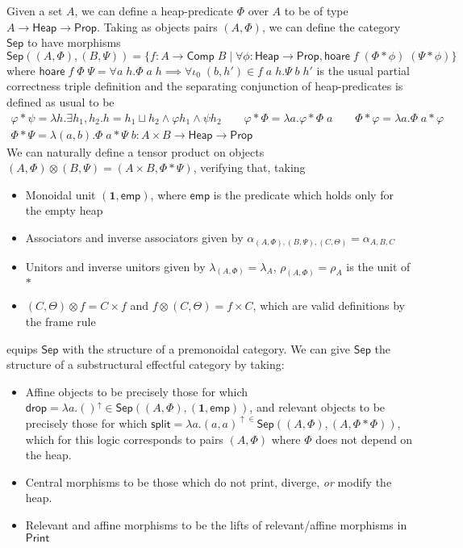 \documentclass[acmsmall,screen,review]{acmart}
\newcommand{\mb}[1]{\ensuremath{\mathbf{#1}}}
\newcommand{\ms}[1]{\ensuremath{\mathsf{#1}}}
\newcommand{\upg}[2]{{#1}^{\uparrow #2}}
\begin{document}
Given a set \(A\), we can define a heap-predicate \(\Phi\) over \(A\) to be of
type \(A \to \ms{Heap} \to \ms{Prop}\). Taking as objects pairs \((A, \Phi)\),
we can define the category \(\ms{Sep}\) to have morphisms
\begin{equation}
  \ms{Sep}((A, \Phi), (B, \Psi)) = \{f: A \to \ms{Comp}\;B 
    \mid \forall \phi: \ms{Heap} \to \ms{Prop}, \ms{hoare}\;f\;(\Phi \ast \phi)\;(\Psi \ast \phi)\}
\end{equation}
where
\(
  \ms{hoare}\;f\;\Phi\;\Psi = \forall a\;h. \Phi\;a\;h \implies \forall \iota_0\;(b, h') \in f\;a\;h. \Psi\;b\;h'
\)
is the usual partial correctness triple definition and the separating
conjunction of heap-predicates is defined as usual to be 
\begin{equation}
  \begin{gathered}
  \varphi \ast \psi = \lambda h. \exists h_1, h_2. h = h_1 \sqcup h_2 \land \varphi h_1 \land \psi h_2 
  \qquad
  \varphi \ast \Phi = \lambda a. \varphi \ast \Phi\;a
  \qquad
  \Phi \ast \varphi = \lambda a. \Phi\;a \ast \varphi \\
  \Phi \ast \Psi = \lambda (a, b). \Phi\;a \ast \Psi\;b: A \times B \to \ms{Heap} \to \ms{Prop}
  \end{gathered}
\end{equation}
We can naturally define a tensor product on objects \((A, \Phi) \otimes (B,
\Psi) = (A \times B, \Phi \ast \Psi)\), verifying that, taking
\begin{itemize}
  \item Monoidal unit \((\mb{1}, \ms{emp})\), where \(\ms{emp}\) is the
  predicate which holds only for the empty heap
  \item Associators and inverse associators given by \(\alpha_{(A, \Phi), (B,
  \Psi), (C, \Theta)} = \alpha_{A, B, C}\)
  \item Unitors and inverse unitors given by \(\lambda_{(A, \Phi)} =
  \lambda_A\), \(\rho_{(A, \Phi)} = \rho_A\)
  is the unit of \(\ast\)
  \item \((C, \Theta) \otimes f = C \times f\) and \(f \otimes (C, \Theta) = f
  \times C\), which are valid definitions by the frame rule
\end{itemize}
equips \(\ms{Sep}\) with the structure of a premonoidal category. We can give \(\ms{Sep}\) the structure of a substructural effectful category by taking:
\begin{itemize}
  \item Affine objects to be precisely those for which \(\ms{drop} =
  \upg{\lambda a. ()}{} \in \ms{Sep}((A, \Phi), (\mb{1}, \ms{emp}))\), and
  relevant objects to be precisely those for which \(\ms{split} = \upg{\lambda
  a. (a, a)} \in \ms{Sep}((A, \Phi), (A, \Phi * \Phi))\), which for this logic
  corresponds to pairs \((A, \Phi)\) where \(\Phi\) does not depend on the heap.
  \item Central morphisms to be those which do not print, diverge, \textit{or}
  modify the heap. %
  \item Relevant and affine morphisms to be the lifts of relevant/affine
  morphisms in \(\ms{Print}\)
\end{itemize}
\end{document}
